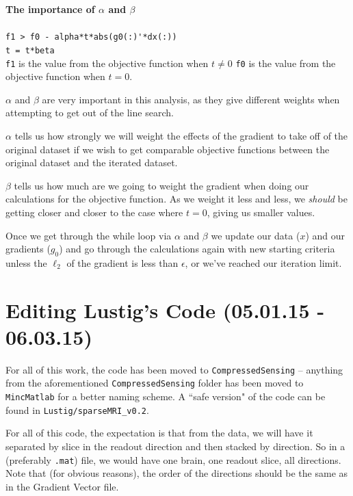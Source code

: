 \documentclass[11 pt]{article}
\newcommand{\bo}{\noindent\textbf}
\let\oldsection\section
\renewcommand\section{\clearpage\newpage\oldsection}
\begin{document}
          \bo{The importance of $\alpha$ and $\beta$}
            \hfill\\\\
            \verb!f1 > f0 - alpha*t*abs(g0(:)'*dx(:))!\\
            \verb!t = t*beta!\\

            \noindent \texttt{f1} is the value from the objective function when $t \neq 0$
            \noindent \texttt{f0} is the value from the objective function when $t = 0$.

            $\alpha$ and $\beta$ are very important in this analysis, as they give different weights when attempting to get out of the line search. 

            $\alpha$ tells us how strongly we will weight the effects of the gradient to take off of the original dataset if we wish to get comparable objective functions between the original dataset and the iterated dataset.  

            $\beta$ tells us how much are we going to weight the gradient when doing our calculations for the objective function. As we weight it less and less, we \emph{should} be getting closer and closer to the case where $t=0$, giving us smaller values.

            Once we get through the while loop via $\alpha$ and $\beta$ we update our data ($x$) and our gradients ($g_0$) and go through the calculations again with new starting criteria unless the $\ell_2$ of the gradient is less than $\epsilon$, or we've reached our iteration limit.

\section{Editing Lustig's Code (05.01.15 - 06.03.15)}

  For all of this work, the code has been moved to \texttt{CompressedSensing} -- anything from the aforementioned \texttt{CompressedSensing} folder has been moved to \texttt{MincMatlab} for a better naming scheme.  A ``safe version" of the code can be found in \texttt{Lustig/sparseMRI\_v0.2}.

  For all of this code, the expectation is that from the data, we will have it separated by slice in the readout direction and then stacked by direction. So in a (preferably \texttt{.mat}) file, we would have one brain, one readout slice, all directions. Note that (for obvious reasons), the order of the directions should be the same as in the Gradient Vector file.
\end{document}
